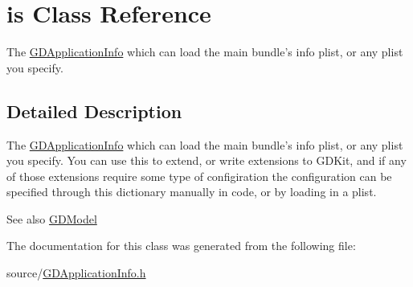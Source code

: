 \hypertarget{classis}{
\section{is Class Reference}
\label{classis}
}


The \hyperlink{interface_g_d_application_info}{GDApplicationInfo} which can load the main bundle's info plist, or any plist you specify.  


\subsection{Detailed Description}
The \hyperlink{interface_g_d_application_info}{GDApplicationInfo} which can load the main bundle's info plist, or any plist you specify. You can use this to extend, or write extensions to GDKit, and if any of those extensions require some type of configiration the configuration can be specified through this dictionary manually in code, or by loading in a plist.

\begin{DoxySeeAlso}{See also}
\hyperlink{interface_g_d_model}{GDModel} 
\end{DoxySeeAlso}


The documentation for this class was generated from the following file:\begin{DoxyCompactItemize}
\item 
source/\hyperlink{_g_d_application_info_8h}{GDApplicationInfo.h}\end{DoxyCompactItemize}
